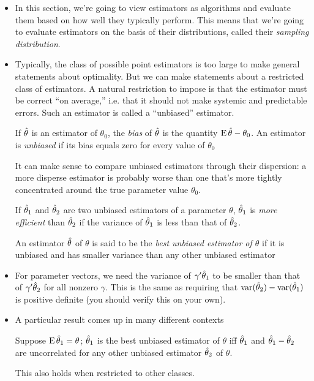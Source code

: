 \begin{itemize}[leftmargin=0pt]

\item In this section, we're going to view estimators as algorithms
  and evaluate them based on how well they typically perform.  This
  means that we're going to evaluate estimators on the basis of their
  distributions, called their \emph{sampling distribution}.  

\item Typically, the class of possible point estimators is too large
  to make general statements about optimality.  But we can make
  statements about a restricted class of estimators.  A natural
  restriction to impose is that the estimator must be correct ``on
  average,'' i.e. that it should not make systemic and predictable
  errors.  Such an estimator is called a ``unbiased'' estimator.

  \begin{defn}
    If $\hat{\theta}$ is an estimator of $\theta_0$, the \emph{bias} of $\hat{\theta}$ is the
    quantity $\operatorname{E} \hat{\theta} - \theta_0$.  An estimator is \emph{unbiased} if its
    bias equals zero for every value of $\theta_0$
  \end{defn}

  It can make sense to compare unbiased estimators through their
  dispersion: a more disperse estimator is probably worse than one
  that's more tightly concentrated around the true parameter value
  $\theta_0$.

  \begin{defn}
    If $\hat{\theta}_1$ and $\hat{\theta}_2$ are two unbiased estimators of a parameter
    $\theta$, $\hat{\theta}_1$ is \emph{more efficient} than $\hat{\theta}_2$ if the variance
    of $\hat{\theta}_1$ is less than that of $\hat{\theta}_2$.
  \end{defn}

  An estimator $\hat{\theta}$ of $\theta$ is said to be the \emph{best unbiased
  estimator of $\theta$} if it is unbiased and has smaller variance than
  any other unbiased estimator

\item For parameter vectors, we need the variance of $\gamma'\hat{\theta}_1$ to be
  smaller than that of $\gamma'\hat{\theta}_2$ for all nonzero $\gamma$.  This is the same
  as requiring that $\operatorname{var}(\hat{\theta}_2) - \operatorname{var}(\hat{\theta}_1)$ is positive definite
  (you should verify this on your own).

\item A particular result comes up in many different contexts
  \begin{thm}
    Suppose $\operatorname{E} \hat{\theta}_1 = \theta$; $\hat{\theta}_1$ is the best unbiased estimator of
    $\theta$ iff $\hat{\theta}_1$ and $\hat{\theta}_1 - \hat{\theta}_2$ are uncorrelated for any other
    unbiased estimator $\hat{\theta}_2$ of $\theta$.
  \end{thm}
  This also holds when restricted to other classes.


\end{itemize}
